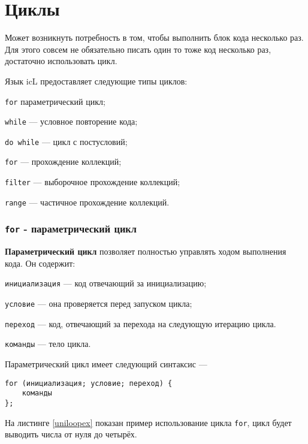 \section{Циклы}

Может возникнуть потребность в том, чтобы выполнить блок кода несколько раз. Для этого совсем не обязательно писать один то тоже код несколько раз, достаточно использовать цикл.

Язык icL предоставляет следующие типы циклов:

\begin{icItems}
\item
	\texttt{for}  параметрический цикл;
\item
	\texttt{while} — условное повторение кода;
\item
	\texttt{do while} — цикл с постусловий;
\item
	\texttt{for} — прохождение коллекций;
\item
	\texttt{filter} — выборочное прохождение коллекций;
\item
	\texttt{range} — частичное прохождение коллекций.
\end{icItems}


\subsubsection{\texttt{for} - параметрический цикл}

{\bf Параметрический цикл} позволяет полностью управлять ходом выполнения кода. Он содержит:

\begin{icItems}
\item
	\texttt{инициализация} — код отвечающий за инициализацию;
\item
	\texttt{условие} — она проверяется перед запуском цикла;
\item
	\texttt{переход} — код, отвечающий за перехода на следующую итерацию цикла.
\item
	\texttt{команды} — тело цикла.
\end{icItems}

Параметрический цикл имеет следующий синтаксис —
\begin{verbatim}
for (инициализация; условие; переход) {
	команды
};
\end{verbatim}

На листинге \ref{uniloopex} показан пример использование цикла \texttt{for}, цикл будет выводить числа от нуля до четырёх.

